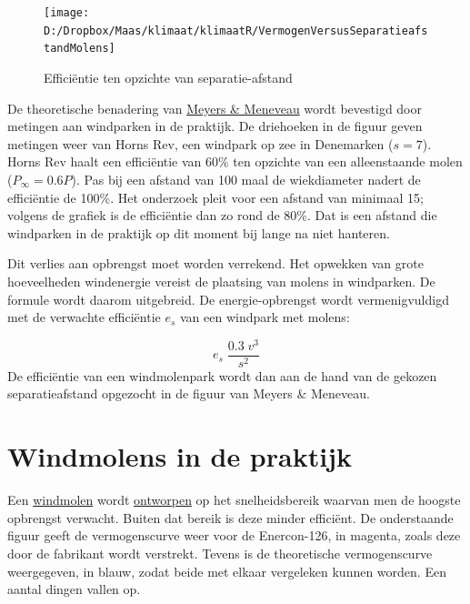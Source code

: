 \documentclass[
  11pt,
  a4paper,
]{book}
\begin{document}
\begin{figure}[H]

{\centering \texttt{[image: D:/Dropbox/Maas/klimaat/klimaatR/VermogenVersusSeparatieafstandMolens]} 

}

\caption{Efficiëntie ten opzichte van separatie-afstand}\label{fig:unnamed-chunk-1}
\end{figure}

\medskip

De theoretische benadering van \href{https://www.researchgate.net/publication/230284417_Optimal_turbine_spacing_in_fully_developed_wind_farm_boundary_layers}{Meyers \& Meneveau} wordt bevestigd door metingen aan windparken in de praktijk. De driehoeken in de figuur geven metingen weer van Horns Rev, een windpark op zee in Denemarken (\(s=7\)). Horns Rev haalt een efficiëntie van 60\% ten opzichte van een alleenstaande molen (\(P_\infty=0.6P\)). Pas bij een afstand van 100 maal de wiekdiameter nadert de efficiëntie de 100\%. Het onderzoek pleit voor een afstand van minimaal 15; volgens de grafiek is de efficiëntie dan zo rond de 80\%. Dat is een afstand die windparken in de praktijk op dit moment bij lange na niet hanteren.

\medskip

Dit verlies aan opbrengst moet worden verrekend. Het opwekken van grote hoeveelheden windenergie vereist de plaatsing van molens in windparken. De formule wordt daarom uitgebreid. De energie-opbrengst wordt vermenigvuldigd met de verwachte efficiëntie \(e_s\) van een windpark met molens:

\[  e_s \; \frac{0.3\;v^3}{s^2}  \]
De efficiëntie van een windmolenpark wordt dan aan de hand van de gekozen separatieafstand opgezocht in de figuur van Meyers \& Meneveau.

\hypertarget{windmolens-in-de-praktijk}{%
\section{Windmolens in de praktijk}\label{windmolens-in-de-praktijk}}

\bigskip

Een \href{https://en.wikipedia.org/wiki/Wind_turbine}{windmolen} wordt \href{https://en.wikipedia.org/wiki/Wind_turbine_design}{ontworpen} op het snelheidsbereik waarvan men de hoogste opbrengst verwacht. Buiten dat bereik is deze minder efficiënt. De onderstaande figuur geeft de vermogenscurve weer voor de Enercon-126, in magenta, zoals deze door de fabrikant wordt verstrekt. Tevens is de theoretische vermogenscurve weergegeven, in blauw, zodat beide met elkaar vergeleken kunnen worden. Een aantal dingen vallen op.
\end{document}
